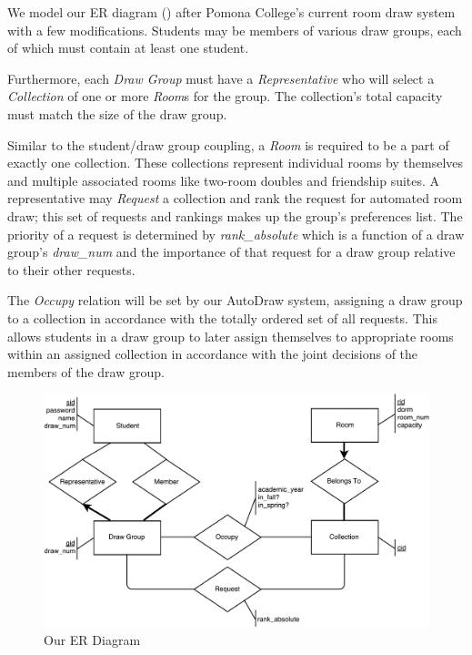 We model our ER diagram () after Pomona College's current
room draw system with a few modifications. Students may be members of various
draw groups, each of which must contain at least one student.

Furthermore, each \emph{Draw Group} must have a \emph{Representative} who will
select a \emph{Collection} of one or more \emph{Room}s for the group. The
collection's total capacity must match the size of the draw group.

Similar to the student/draw group coupling, a \emph{Room} is required to be a
part of exactly one collection. These collections represent individual rooms by
themselves and multiple associated rooms like two-room doubles and friendship
suites. A representative may \emph{Request} a collection and rank the request
for automated room draw; this set of requests and rankings makes up the group's
preferences list. The priority of a request is determined by
\emph{rank\_absolute} which is a function of a draw group's \emph{draw\_num} and
the importance of that request for a draw group relative to their other
requests.

The \emph{Occupy} relation will be set by our AutoDraw system, assigning a draw
group to a collection in accordance with the totally ordered set of all
requests. This allows students in a draw group to later assign themselves to
appropriate rooms within an assigned collection in accordance with the joint
decisions of the members of the draw group.

\begin{figure}[H] \centering
\includegraphics[width=\textwidth]{er_crop.pdf}
\caption{Our ER Diagram}
\label{fig:er-diagram}
\end{figure}

